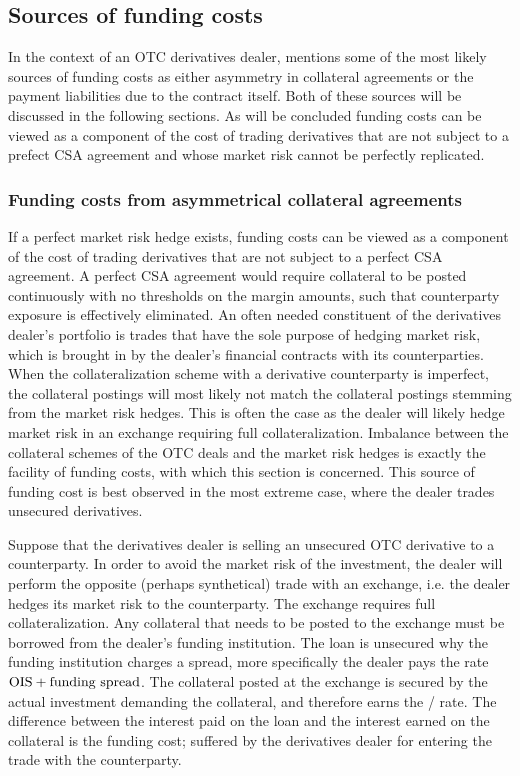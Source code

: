 \documentclass[../../../main.tex]{subfiles}
\begin{document}
    \subsection{Sources of funding costs}
        In the context of an OTC derivatives dealer, 
        \cite{Ruiz2013FVA} mentions some of the most likely sources of funding costs as
        either asymmetry in collateral agreements or the payment liabilities due to the contract itself.
        Both of these sources will be discussed in the following sections.
        As will be concluded funding costs can be viewed as a component of the cost of trading derivatives
        that are not subject to a prefect CSA agreement and whose market risk cannot be perfectly replicated.

    \subsubsection{Funding costs from asymmetrical collateral agreements}
        If a perfect market risk hedge exists, funding costs can be viewed 
        as a component of the cost of trading derivatives that are not subject to a perfect CSA agreement.
        A perfect CSA agreement would require collateral to be posted continuously with no thresholds on the margin amounts,
        such that counterparty exposure is effectively eliminated.
        An often needed constituent of the derivatives dealer's portfolio
        is trades that have the sole purpose of hedging market risk,
        which is brought in by the dealer's financial contracts with its counterparties.
        When the collateralization scheme with a derivative counterparty is imperfect, 
        the collateral postings will most likely not match the collateral postings stemming from the market risk hedges.
        This is often the case as the dealer will likely hedge market risk in an exchange requiring full collateralization.
        Imbalance between the collateral schemes of the OTC deals and the market risk hedges
        is exactly the facility of funding costs, with which this section is concerned.
        This source of funding cost is best observed in the most extreme case, where the dealer trades unsecured derivatives. 

        Suppose that the derivatives dealer is selling an unsecured OTC derivative to a counterparty.
        In order to avoid the market risk of the investment, 
        the dealer will perform the opposite (perhaps synthetical) trade with an exchange,
        i.e. the dealer hedges its market risk to the counterparty.
        The exchange requires full collateralization.
        Any collateral that needs to be posted to the exchange must be borrowed from the dealer's funding institution.
        The loan is unsecured why the funding institution charges a spread,
        more specifically the dealer pays the rate $\OIS/ + \text{funding spread}$.
        The collateral posted at the exchange is secured by the actual investment demanding the collateral,
        and therefore earns the \OIS/ rate.
        The difference between the interest paid on the loan and the interest earned on the collateral is the funding cost;
        suffered by the derivatives dealer for entering the trade with the counterparty. 
\end{document}
